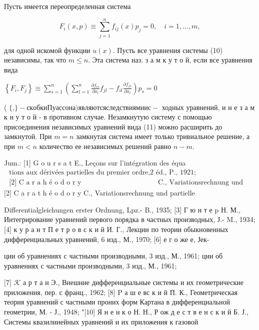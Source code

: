 \documentclass[10pt]{article}
\begin{document}
Пусть имеется переопределенная система



\[

F_{i}(x, p) \equiv \sum_{j=1}^{n} f_{i j}(x) p_{j}=0, \quad i=1, \ldots, m,

\]



для одной искомой функции $u(x)$. Пусть все уравнения системы (10) независимы, так что $m \leqslant n$. Эта система наз. з а м к у т о й, если все уравнения вида



$\left\{F_{i}, F_{j}\right\} \equiv \sum_{s=1}^{n}\left(\sum_{l=1}^{n} \frac{\partial f_{i s}}{\partial x_{l}} f_{j l}-f_{i l} \frac{\partial f_{j s}}{\partial x_{l}}\right) p_{s}=0$



( $\{$,$\} - скобки Пуассона) являются следствиями ис-$ ходных уравнений, и н е з а м к н у т о й - в противном случае. Незамкнутую систему с помощью присоединения независимых уравнений вида (11) можно расширить до замкнутой. При $m=n$ замкнутая система имеет только тривиальное решение, а при $m<n$ количество ее независимых решений равно $n-m$.



Jum.: [1] G o u r s a t E., Leçons sur l'intégration des équa$\begin{array}{ll}\text { tions aux dérivées partielles du premier ordre, } 2 \text { éd., P., 1921; } \\ \text { [2] C a r a h é o d o r y } & \text { C., Variationsrechnung und partielle }\end{array}$ [2] C a r a t h é o d o r y C., Variationsrechnung und partielle

Differentialgleichungen erster Ordnung, Lpz.- B., 1935; [3] Г ю н т е p Н. М., Интегрирование уравнений первого порядка в частных производных, Ј.- M., 1934; [4] к у р а н т П е т р о в с к и й И. Г., Лекции по теории обыкновенных дифференциальных уравнений, 6 изд., М., 1970; [6] е г о же е, Јек-

ции об уравнениях с частными производными, 3 изд., М., 1961; ции об уравнениях с частными производными, 3 изд., М., 1961;

[7] $\mathcal{K}$ а р т а н Э., Внешние дифференциальные системы и их геометрические приложения, пер. с франц., 1962; [8] P а ш е вс к и й П. К., Геометрическая теория уравнений с частными проних форм Картана в дифференциальной геометрии, М. - Ј., 1948; "[10] Я н е н к о Н. Н., Р ож д е с т в е н с к и й Б. Ј., Системы квазилинейных уравнений и их приложения к газовой
\end{document}
